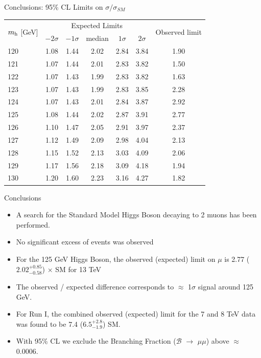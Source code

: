 \documentclass[pdf, 9pt]{beamer}
\begin{document}
  \begin{frame}{Conclusions: 95\% CL Limits on $\sigma/\sigma_{SM}$}
  \begin{center}
\begin{tabular}{lcccccc}
\hline
\multirow{2}{*}{$m_\textup{h}$ [GeV]} & \multicolumn{5}{c}{Expected Limits} & \multirow{2}{*}{Observed limit} \\
\cline{2-6}
& $-2\sigma$ & $-1\sigma$ & median  & $1\sigma$ & $2\sigma$ & \\
\hline
120 & 1.08 & 1.44 & 2.02 & 2.84 & 3.84 & 1.90\\
121 & 1.07 & 1.44 & 2.01 & 2.83 & 3.82 & 1.50\\
122 & 1.07 & 1.43 & 1.99 & 2.83 & 3.82 & 1.63\\
123 & 1.07 & 1.43 & 1.99 & 2.83 & 3.85 & 2.28\\
\alert{124} & \alert{1.07} & \alert{1.43} & \alert{2.01} & \alert{2.84} & \alert{3.87} & \alert{2.92}\\
\alert{125} & \alert{1.08} & \alert{1.44} & \alert{2.02} & \alert{2.87} & \alert{3.91} & \alert{2.77}\\
\alert{126} & \alert{1.10} & \alert{1.47} & \alert{2.05} & \alert{2.91} & \alert{3.97} & \alert{2.37}\\
127 & 1.12 & 1.49 & 2.09 & 2.98 & 4.04 & 2.13\\
128 & 1.15 & 1.52 & 2.13 & 3.03 & 4.09 & 2.06\\
129 & 1.17 & 1.56 & 2.18 & 3.09 & 4.18 & 1.94\\
130 & 1.20 & 1.60 & 2.23 & 3.16 & 4.27 & 1.82\\
\hline
\end{tabular}
\end{center}
  \end{frame}

  \begin{frame}{Conclusions}
    \begin{itemize}
      \item A search for the Standard Model Higgs Boson decaying to 2 muons has been performed.
      \item No significant excess of events was observed
      \item For the 125 GeV Higgs Boson, the observed (expected) limit on $\mu$ is 2.77 ($2.02^{+0.85}_{-0.58}$) $\times$ SM for 13 TeV
      \item The observed / expected difference corresponds to $\approx$ 1$\sigma$ signal around 125 GeV.
      \item For Run I, the combined observed (expected) limit for the 7 and 8 TeV data was found to be 7.4 ($6.5^{+2.8}_{-1.9}$) \times SM.
      \item \alert{With 95\% CL we exclude the Branching Fraction ($\mathcal{B}$ $\rightarrow$ $\mu\mu$) above $\approx$ 0.0006}.
    \end{itemize}
  \end{frame}
\end{document}
